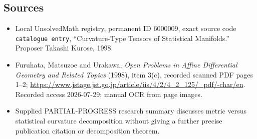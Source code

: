 \documentclass[11pt]{article}
\begin{document}
\subsection{Sources}
\begin{itemize}
\item Local UnsolvedMath registry, permanent ID \(6000009\), exact source code \texttt{catalogue entry}, ``Curvature-Type Tensors of Statistical Manifolds.'' Proposer Takashi Kurose, 1998.
\item Furuhata, Matsuzoe and Urakawa, \emph{Open Problems in Affine Differential Geometry and Related Topics} (1998), item 3(c), recorded scanned PDF pages 1--2; \url{https://www.jstage.jst.go.jp/article/iis/4/2/4_2_125/_pdf/-char/en}. Recorded access 2026-07-29; manual OCR from page images.
\item Supplied PARTIAL-PROGRESS research summary discusses metric versus statistical curvature decomposition without giving a further precise publication citation or decomposition theorem.
\end{itemize}
\end{document}
